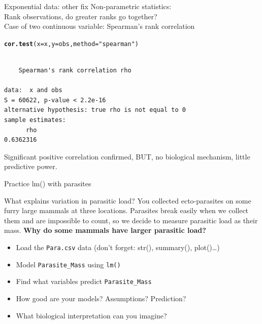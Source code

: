 \documentclass[10pt]{beamer}\usepackage[]{graphicx}\usepackage[]{color}
\makeatletter
\newcommand{\hlstr}[1]{\textcolor[rgb]{0.192,0.494,0.8}{#1}}%
\newcommand{\hlstd}[1]{\textcolor[rgb]{0.345,0.345,0.345}{#1}}%
\newcommand{\hlkwc}[1]{\textcolor[rgb]{0.333,0.667,0.333}{#1}}%
\newcommand{\hlkwd}[1]{\textcolor[rgb]{0.737,0.353,0.396}{\textbf{#1}}}%
\newenvironment{kframe}{%
 \def\at@end@of@kframe{}%
 \ifinner\ifhmode%
  \def\at@end@of@kframe{\end{minipage}}%
  \begin{minipage}{\columnwidth}%
 \fi\fi%
 \def\FrameCommand##1{\hskip\@totalleftmargin \hskip-\fboxsep
 \colorbox{shadecolor}{##1}\hskip-\fboxsep
     \hskip-\linewidth \hskip-\@totalleftmargin \hskip\columnwidth}%
 \MakeFramed {\advance\hsize-\width
   \@totalleftmargin\z@ \linewidth\hsize
   \@setminipage}}%
 {\par\unskip\endMakeFramed%
 \at@end@of@kframe}
\newenvironment{knitrout}{}{} %
\makeatother
\begin{document}
\begin{frame}[fragile]{Exponential data: other fix}
Non-parametric statistics:\\ 
Rank observations, do greater ranks go together?\\ \pause
Case of two continuous variable: Spearman's rank correlation
\pause
\begin{knitrout}\small
{}\color{fgcolor}\begin{kframe}
\begin{alltt}
\hlkwd{cor.test}\hlstd{(}\hlkwc{x} \hlstd{= x,} \hlkwc{y} \hlstd{= obs,} \hlkwc{method} \hlstd{=} \hlstr{"spearman"}\hlstd{)}
\end{alltt}
\begin{verbatim}

	Spearman's rank correlation rho

data:  x and obs
S = 60622, p-value < 2.2e-16
alternative hypothesis: true rho is not equal to 0
sample estimates:
      rho 
0.6362316 
\end{verbatim}
\end{kframe}
\end{knitrout}
\pause
Significant positive correlation confirmed, BUT, no biological mechanism, little predictive power.

\end{frame}

\begin{frame}[fragile]{Practice lm() with parasites}


  
  \begin{alertblock}{What explains variation in parasitic load?}
  You collected ecto-parasites on some furry large mammals at three locations. Parasites break easily when we collect them and are impossible to count, so we decide to measure parasitic load as their mass. \textbf{Why do some mammals have larger parasitic load?} \pause
    \begin{itemize}
      \item Load the \texttt{Para.csv} data (don't forget: str(), summary(), plot()\dots)
      \item Model \verb+Parasite_Mass+ using \texttt{lm()}
      \item Find what variables predict \verb+Parasite_Mass+
      \item How good are your models? Assumptions? Prediction?
      \item What biological interpretation can you imagine?
      \end{itemize}
  \end{alertblock}
  
\end{frame}
\end{document}
